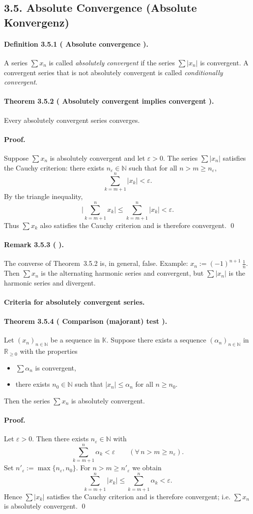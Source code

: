\documentclass[12pt]{article}
\newcommand{\N}{\mathbb{N}}
\newcommand{\R}{\mathbb{R}}
\newcommand{\K}{\mathbb{K}} %
\newcommand{\eps}{\varepsilon}
\newcommand{\NumberedDefinition}[3]{%
\paragraph*{Definition #1 ( #2 ).} #3\par}
\newcommand{\NumberedTheorem}[3]{%
\paragraph*{Theorem #1 ( #2 ).} #3\par}
\newcommand{\NumberedRemark}[3]{%
\paragraph*{Remark #1 ( #2 ).} #3\par}
\begin{document}
\subsection*{3.5. Absolute Convergence (Absolute Konvergenz)}

\NumberedDefinition{3.5.1}{Absolute convergence}{A series $\sum x_n$ is called \emph{absolutely convergent} if the series $\sum |x_n|$ is convergent. A convergent series that is not absolutely convergent is called \emph{conditionally convergent}.}

\NumberedTheorem{3.5.2}{Absolutely convergent implies convergent}{Every absolutely convergent series converges.}
\paragraph{Proof.}
Suppose $\sum x_n$ is absolutely convergent and let $\eps>0$. The series $\sum |x_n|$ satisfies the Cauchy criterion: there exists $n_\eps\in\N$ such that for all $n>m\ge n_\eps$,
\[
	\sum_{k=m+1}^{n} |x_k| < \eps.
\]
By the triangle inequality,
\[
	\Bigg|\sum_{k=m+1}^{n} x_k\Bigg| \le \sum_{k=m+1}^{n} |x_k| < \eps.
\]
Thus $\sum x_k$ also satisfies the Cauchy criterion and is therefore convergent. \qed

\NumberedRemark{3.5.3}{}{The converse of Theorem~3.5.2 is, in general, false. Example: $x_n := (-1)^{n+1}\,\tfrac{1}{n}$. Then $\sum x_n$ is the alternating harmonic series and convergent, but $\sum |x_n|$ is the harmonic series and divergent.}

\paragraph{Criteria for absolutely convergent series.}

\NumberedTheorem{3.5.4}{Comparison (majorant) test}{Let $(x_n)_{n\in\N}$ be a sequence in $\K$. Suppose there exists a sequence $(\alpha_n)_{n\in\N}$ in $\R_{\ge0}$ with the properties
\begin{itemize}
	\item $\sum \alpha_n$ is convergent,
	\item there exists $n_0\in\N$ such that $|x_n|\le \alpha_n$ for all $n\ge n_0$.
\end{itemize}
Then the series $\sum x_n$ is absolutely convergent.}
\paragraph{Proof.}
Let $\eps>0$. Then there exists $n_\eps\in\N$ with
\[
	\sum_{k=m+1}^{n} \alpha_k < \eps \qquad (\forall\, n>m\ge n_\eps).
\]
Set $n'_\eps := \max\{n_\eps, n_0\}$. For $n>m\ge n'_\eps$ we obtain
\[
	\sum_{k=m+1}^{n} |x_k| \le \sum_{k=m+1}^{n} \alpha_k < \eps.
\]
Hence $\sum |x_k|$ satisfies the Cauchy criterion and is therefore convergent; i.e. $\sum x_n$ is absolutely convergent. \qed
\end{document}
